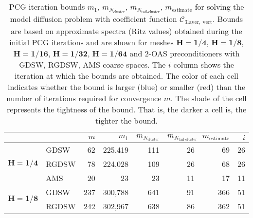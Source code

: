 \begin{table}[H]
\centering
\caption{PCG iteration bounds $m_1$, $m_{N_{\text{cluster}}}$, $m_{N_{\text{tail-cluster}}}$, $m_{\text{estimate}}$ for solving the model diffusion problem with coefficient function $\mathcal{C}_{\mathrm{3layer, \ vert}}$. Bounds are based on approximate spectra (Ritz values) obtained during the initial PCG iterations and are shown for meshes $\mathbf{H=1/4}$, $\mathbf{H=1/8}$, $\mathbf{H=1/16}$, $\mathbf{H=1/32}$, $\mathbf{H=1/64}$ and 2-OAS preconditioners with GDSW, RGDSW, AMS coarse spaces. The $i$ column shows the iteration at which the bounds are obtained. The color of each cell indicates whether the bound is larger (blue) or smaller (red) than the number of iterations required for convergence $m$. The shade of the cell represents the tightness of the bound. That is, the darker a cell is, the tighter the bound.}
\label{tab:cg_iteration_bound_coef=3lvert}
\begin{tabular}{llrrrrrr}
\toprule
 &  & $m$ & $m_1$ & $m_{N_{\text{cluster}}}$ & $m_{N_{\text{tail-cluster}}}$ & $m_{\text{estimate}}$ & $i$ \\
\midrule
\multirow[c]{3}{*}{$\mathbf{H=1/4}$} & GDSW & 62 & {\cellcolor[HTML]{C1D2F8}} \color[HTML]{000000} 225,419 & {\cellcolor[HTML]{9FC0F4}} \color[HTML]{000000} 111 & {\cellcolor[HTML]{945357}} \color[HTML]{F1F1F1} 26 & {\cellcolor[HTML]{7EAFF1}} \color[HTML]{000000} 69 & 26 \\
\cline{2-8}
 & RGDSW & 78 & {\cellcolor[HTML]{AFC9F6}} \color[HTML]{000000} 224,028 & {\cellcolor[HTML]{7EAFF1}} \color[HTML]{000000} 109 & {\cellcolor[HTML]{BB9CA9}} \color[HTML]{F1F1F1} 26 & {\cellcolor[HTML]{945357}} \color[HTML]{F1F1F1} 68 & 26 \\
\cline{2-8}
 & AMS & 20 & {\cellcolor[HTML]{7EAFF1}} \color[HTML]{000000} 23 & {\cellcolor[HTML]{7EAFF1}} \color[HTML]{000000} 23 & {\cellcolor[HTML]{BB9CA9}} \color[HTML]{F1F1F1} 11 & {\cellcolor[HTML]{945357}} \color[HTML]{F1F1F1} 17 & 11 \\
\cline{1-8} \cline{2-8}
\multirow[c]{3}{*}{$\mathbf{H=1/8}$} & GDSW & 237 & {\cellcolor[HTML]{C1D2F8}} \color[HTML]{000000} 300,788 & {\cellcolor[HTML]{9FC0F4}} \color[HTML]{000000} 641 & {\cellcolor[HTML]{945357}} \color[HTML]{F1F1F1} 91 & {\cellcolor[HTML]{7EAFF1}} \color[HTML]{000000} 366 & 51 \\
\cline{2-8}
 & RGDSW & 242 & {\cellcolor[HTML]{C1D2F8}} \color[HTML]{000000} 302,967 & {\cellcolor[HTML]{9FC0F4}} \color[HTML]{000000} 638 & {\cellcolor[HTML]{945357}} \color[HTML]{F1F1F1} 86 & {\cellcolor[HTML]{7EAFF1}} \color[HTML]{000000} 362 & 51 \\

\end{tabular}
\end{table}
